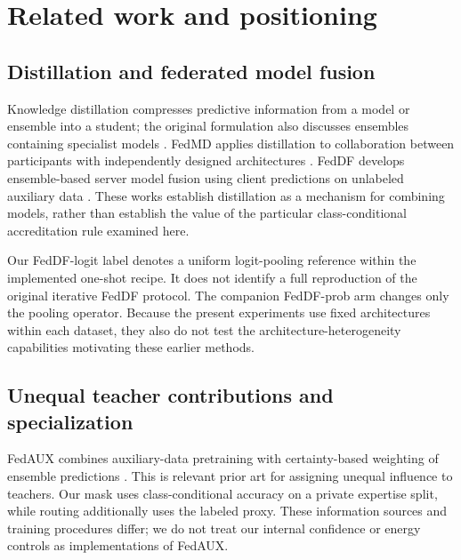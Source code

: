 \hypertarget{related-work-and-positioning}{%
\section{Related work and positioning}\label{related-work-and-positioning}}

\hypertarget{distillation-and-federated-model-fusion}{%
\subsection{Distillation and federated model fusion}\label{distillation-and-federated-model-fusion}}

Knowledge distillation compresses predictive information from a model or ensemble into a student; the original formulation also discusses ensembles containing specialist models \cite{hinton2015}. FedMD applies distillation to collaboration between participants with independently designed architectures \cite{li2019}. FedDF develops ensemble-based server model fusion using client predictions on unlabeled auxiliary data \cite{lin2020}. These works establish distillation as a mechanism for combining models, rather than establish the value of the particular class-conditional accreditation rule examined here.

Our FedDF-logit label denotes a uniform logit-pooling reference within the implemented one-shot recipe. It does not identify a full reproduction of the original iterative FedDF protocol. The companion FedDF-prob arm changes only the pooling operator. Because the present experiments use fixed architectures within each dataset, they also do not test the architecture-heterogeneity capabilities motivating these earlier methods.

\hypertarget{unequal-teacher-contributions-and-specialization}{%
\subsection{Unequal teacher contributions and specialization}\label{unequal-teacher-contributions-and-specialization}}

FedAUX combines auxiliary-data pretraining with certainty-based weighting of ensemble predictions \cite{sattler2021}. This is relevant prior art for assigning unequal influence to teachers. Our mask uses class-conditional accuracy on a private expertise split, while routing additionally uses the labeled proxy. These information sources and training procedures differ; we do not treat our internal confidence or energy controls as implementations of FedAUX.

